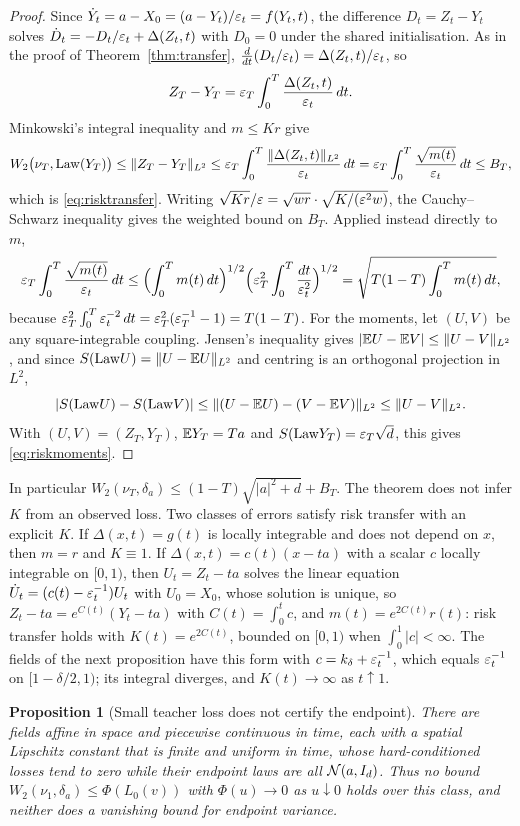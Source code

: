 \documentclass{article} %
\theoremstyle{plain}
\newtheorem{proposition}[theorem]{Proposition}
\theoremstyle{definition}
\theoremstyle{remark}
\begin{document}
\begin{proof}
Since $\dot Y_t=a-X_0=(a-Y_t)/\varepsilon_t=f(Y_t,t)$, the difference $D_t=Z_t-Y_t$ solves
$\dot D_t=-D_t/\varepsilon_t+\Delta(Z_t,t)$ with $D_0=0$ under the shared initialisation. As in the proof
of Theorem~\ref{thm:transfer}, $\frac{d}{dt}(D_t/\varepsilon_t)=\Delta(Z_t,t)/\varepsilon_t$, so
\[
Z_T-Y_T=\varepsilon_T\int_0^T\frac{\Delta(Z_t,t)}{\varepsilon_t}\,dt .
\]
Minkowski's integral inequality and $m\le Kr$ give
\[
W_2\bigl(\nu_T,\mathrm{Law}(Y_T)\bigr)\le\|Z_T-Y_T\|_{L^2}
\le\varepsilon_T\int_0^T\frac{\|\Delta(Z_t,t)\|_{L^2}}{\varepsilon_t}\,dt
=\varepsilon_T\int_0^T\frac{\sqrt{m(t)}}{\varepsilon_t}\,dt\le B_T,
\]
which is \eqref{eq:risktransfer}. Writing $\sqrt{K r}/\varepsilon=\sqrt{wr}\cdot\sqrt{K/(\varepsilon^2w)}$, the
Cauchy--Schwarz inequality gives the weighted bound on $B_T$. Applied instead directly to $m$,
\[
\varepsilon_T\int_0^T\frac{\sqrt{m(t)}}{\varepsilon_t}\,dt
\le\Bigl(\int_0^Tm(t)\,dt\Bigr)^{1/2}\Bigl(\varepsilon_T^2\int_0^T\frac{dt}{\varepsilon_t^2}\Bigr)^{1/2}
=\sqrt{T(1-T)\int_0^Tm(t)\,dt},
\]
because $\varepsilon_T^2\int_0^T\varepsilon_t^{-2}\,dt=\varepsilon_T^2(\varepsilon_T^{-1}-1)=T(1-T)$. For the moments, let
$(U,V)$ be any square-integrable coupling. Jensen's inequality gives
$|\mathbb{E} U-\mathbb{E} V|\le\|U-V\|_{L^2}$, and since $S(\mathrm{Law} U)=\|U-\mathbb{E} U\|_{L^2}$ and centring is an orthogonal
projection in $L^2$,
\[
|S(\mathrm{Law} U)-S(\mathrm{Law} V)|\le\|(U-\mathbb{E} U)-(V-\mathbb{E} V)\|_{L^2}\le\|U-V\|_{L^2}.
\]
With $(U,V)=(Z_T,Y_T)$, $\mathbb{E} Y_T=Ta$ and $S(\mathrm{Law} Y_T)=\varepsilon_T\sqrt d$, this gives
\eqref{eq:riskmoments}.
\end{proof}

In particular $W_2(\nu_T,\delta_a)\le(1-T)\sqrt{|a|^2+d}+B_T$. The theorem does not infer $K$
from an observed loss. Two classes of errors satisfy risk transfer with an explicit $K$. If
$\Delta(x,t)=g(t)$ is locally integrable and does not depend on $x$, then $m=r$ and $K\equiv1$.
If $\Delta(x,t)=c(t)(x-ta)$ with a scalar $c$ locally integrable on $[0,1)$, then $U_t=Z_t-ta$
solves the linear equation $\dot U_t=(c(t)-\varepsilon_t^{-1})U_t$ with $U_0=X_0$, whose solution is
unique, so $Z_t-ta=e^{C(t)}(Y_t-ta)$ with $C(t)=\int_0^tc$, and $m(t)=e^{2C(t)}r(t)$: risk
transfer holds with $K(t)=e^{2C(t)}$, bounded on $[0,1)$ when $\int_0^1|c|<\infty$. The fields of
the next proposition have this form with $c=k_\delta+\varepsilon_t^{-1}$, which equals $\varepsilon_t^{-1}$ on
$[1-\delta/2,1)$; its integral diverges, and $K(t)\to\infty$ as $t\uparrow1$.

\begin{proposition}[Small teacher loss does not certify the endpoint]
\label{prop:loss-no-certificate}
There are fields affine in space and piecewise continuous in time, each with a
spatial Lipschitz constant that is finite and uniform in time, whose hard-conditioned losses tend
to zero while their endpoint laws are all $\mathcal{N}(a,I_d)$. Thus no bound
$W_2(\nu_1,\delta_a)\le\Phi(L_0(v))$ with $\Phi(u)\to0$ as $u\downarrow0$
holds over this class, and neither does a vanishing bound for endpoint variance.
\end{proposition}
\end{document}

